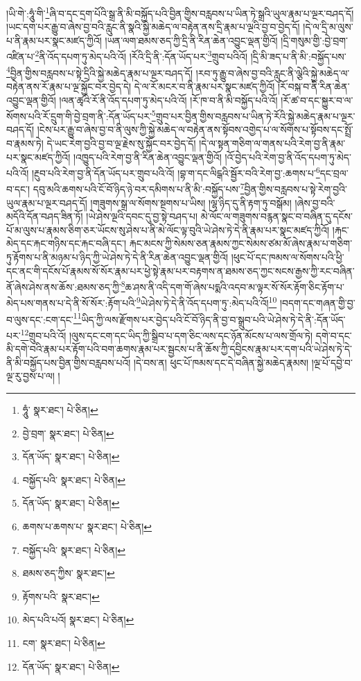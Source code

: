 །ཡི་གེ་:ཧཱུཾ་གི་\footnote{ཧཱུཾ་  སྣར་ཐང་།  པེ་ཅིན། }ཞི་བ་དང་དྲག་པོའི་སྒྲ་ནི་མི་བསྐྱོད་པའི་བྱིན་གྱིས་བརླབས་པ་ཡིན་ཏེ་སྒྲའི་ཡུལ་རྣམ་པ་ལྔར་བཤད་དོ། །ཡང་དག་པར་རྒྱུ་བ་ཞེས་བྱ་བའི་རླུང་ནི་སྣའི་སྐྱེ་མཆེད་ལ་བརྟེན་ནས་དྲི་རྣམ་པ་ལྔའི་བྱ་བ་བྱེད་དོ། །དེ་ལ་དྲི་མ་ལུས་པ་ནི་རྣམ་པར་སྣང་མཛད་ཀྱིའོ། །ཡན་ལག་ཐམས་ཅད་ཀྱི་དྲི་ནི་རིན་ཆེན་འབྱུང་ལྡན་གྱིའོ། །དྲི་གསུམ་གྱི་:བྱེ་བྲག་འཛིན་པ་\footnote{བྱེ་བྲག་  སྣར་ཐང་།  པེ་ཅིན། }ནི་འོད་དཔག་ཏུ་མེད་པའི་འོ། །རོའི་དྲི་ནི་:དོན་ཡོད་པར་\footnote{དོན་ཡོད་  སྣར་ཐང་།  པེ་ཅིན། }གྲུབ་པའིའོ། །དྲི་མི་ཟད་པ་ནི་མི་:བསྐྱོད་པས་\footnote{བསྐྱོད་པའི་  སྣར་ཐང་།  པེ་ཅིན། }བྱིན་གྱིས་བརླབས་པ་སྟེ་དྲིའི་སྐྱེ་མཆེད་རྣམ་པ་ལྔར་བཤད་དོ། །རབ་ཏུ་རྒྱུ་བ་ཞེས་བྱ་བའི་རླུང་ནི་ལྕེའི་སྐྱེ་མཆེད་ལ་བརྟེན་ནས་རོ་རྣམ་པ་ལྔ་སྐྱོང་བར་བྱེད་དེ། དེ་ལ་རོ་མངར་བ་ནི་རྣམ་པར་སྣང་མཛད་ཀྱིའོ། །རོ་བསྐ་བ་ནི་རིན་ཆེན་འབྱུང་ལྡན་གྱིའོ། །ལན་ཚྭའི་རོ་ནི་འོད་དཔག་ཏུ་མེད་པའི་འོ། །རོ་ཁ་བ་ནི་མི་བསྐྱོད་པའི་འོ། །རོ་ཚ་བ་དང་སྐྱུར་བ་ལ་སོགས་པའི་རོ་དྲུག་གི་བྱེ་བྲག་ནི་:དོན་ཡོད་པར་\footnote{དོན་ཡོད་  སྣར་ཐང་།  པེ་ཅིན། }གྲུབ་པར་བྱིན་གྱིས་བརླབས་པ་ཡིན་ཏེ་རོའི་སྐྱེ་མཆེད་རྣམ་པ་ལྔར་བཤད་དོ། །ངེས་པར་རྒྱུ་བ་ཞེས་བྱ་བ་ནི་ལུས་ཀྱི་སྐྱེ་མཆེད་ལ་བརྟེན་ནས་སྟོབས་འགྱེད་པ་ལ་སོགས་པ་སྟོབས་དང་སྤྲོ་བ་རྣམས་ཏེ། དེ་ཡང་རེག་བྱའི་བྱ་བ་ལྔ་རྗེས་སུ་སྐྱོང་བར་བྱེད་དོ། །དེ་ལ་སྟན་གཅིག་ལ་གནས་པའི་རེག་བྱ་ནི་རྣམ་པར་སྣང་མཛད་ཀྱིའོ། །འཁྱུད་པའི་རེག་བྱ་ནི་རིན་ཆེན་འབྱུང་ལྡན་གྱིའོ། །འོ་བྱེད་པའི་རེག་བྱ་ནི་འོད་དཔག་ཏུ་མེད་པའི་འོ། །རྔུབ་པའི་རེག་བྱ་ནི་དོན་ཡོད་པར་གྲུབ་པའི་འོ། །བྷ་ག་དང་ལིངྒའི་སྦྱོར་བའི་རེག་བྱ་:ཆགས་པ་\footnote{ཆགས་པ་ཆགས་པ་  སྣར་ཐང་།  པེ་ཅིན། }དང་བྲལ་བ་དང་། དབུ་མའི་ཆགས་པའི་ངོ་བོ་ཉིད་ཉེ་བར་དམིགས་པ་ནི་མི་:བསྐྱོད་པས་\footnote{བསྐྱོད་པའི་  སྣར་ཐང་།  པེ་ཅིན། }བྱིན་གྱིས་བརླབས་པ་སྟེ་རེག་བྱའི་ཡུལ་རྣམ་པ་ལྔར་བཤད་དོ། །གཟུགས་སྒྲ་ལ་སོགས་སྔགས་པ་ཡིས། །ལྷ་ཉིད་དུ་ནི་རྟག་ཏུ་བསྒོམ། །ཞེས་བྱ་བའི་མདོའི་དོན་བཤད་ཟིན་ཏོ། །ཡེ་ཤེས་ལྔའི་དབང་དུ་བྱ་སྟེ་བཤད་པ། མེ་ལོང་ལ་གཟུགས་བརྙན་སྣང་བ་བཞིན་དུ་དངོས་པོ་མ་ལུས་པ་རྣམས་ཅིག་ཅར་ཡོངས་སུ་ཤེས་པ་ནི་མེ་ལོང་ལྟ་བུའི་ཡེ་ཤེས་ཏེ་དེ་ནི་རྣམ་པར་སྣང་མཛད་ཀྱིའོ། །རྐང་མེད་དང་རྐང་གཉིས་དང་རྐང་བཞི་དང་། རྐང་མངས་ཀྱི་སེམས་ཅན་རྣམས་ཀྱང་སེམས་ཙམ་མོ་ཞེས་རྣམ་པ་གཅིག་ཏུ་རྟོགས་པ་ནི་མཉམ་པ་ཉིད་ཀྱི་ཡེ་ཤེས་ཏེ་དེ་ནི་རིན་ཆེན་འབྱུང་ལྡན་གྱིའོ། །ཕུང་པོ་དང་ཁམས་ལ་སོགས་པའི་ཕྱི་དང་ནང་གི་དངོས་པོ་རྣམས་སོ་སོར་རྣམ་པར་ཕྱེ་སྟེ་རྣམ་པར་བརྟགས་ན་ཐམས་ཅད་ཀྱང་སངས་རྒྱས་ཀྱི་རང་བཞིན་ནོ་ཞེས་ཤེས་ནས་ཆོས་:ཐམས་ཅད་ཀྱི་\footnote{ཐམས་ཅད་ཀྱིས་  སྣར་ཐང་། }ཆ་ཤས་ནི་འདི་དག་གོ་ཞེས་པདྨའི་འདབ་མ་ལྟར་སོ་སོར་རྟོག་ཅིང་རྟོག་པ་མེད་པས་གནས་པ་དེ་ནི་སོ་སོར་:རྟོག་པའི་\footnote{རྟོགས་པའི་  སྣར་ཐང་། }ཡེ་ཤེས་ཏེ་དེ་ནི་འོད་དཔག་ཏུ་:མེད་པའི་འོ།\footnote{མེད་པའི་པའོ།  སྣར་ཐང་།  པེ་ཅིན། } །བདག་དང་གཞན་གྱི་བྱ་བ་ལུས་དང་:ངག་དང་\footnote{ངག་  སྣར་ཐང་།  པེ་ཅིན། }ཡིད་ཀྱི་ལས་རྫོགས་པར་བྱེད་པའི་ངོ་བོ་ཉིད་ནི་བྱ་བ་སྒྲུབ་པའི་ཡེ་ཤེས་ཏེ་དེ་ནི་:དོན་ཡོད་པར་\footnote{དོན་ཡོད་  སྣར་ཐང་།  པེ་ཅིན། }གྲུབ་པའི་འོ། །ལུས་དང་ངག་དང་ཡིད་ཀྱི་སྒྲིབ་པ་དག་ཅིང་ལས་དང་ཉོན་མོངས་པ་ལས་གྲོལ་ཏེ། དགེ་བ་དང་མི་དགེ་བའི་རྣམ་པར་རྟོག་པའི་བག་ཆགས་རྣམ་པར་སྦྱངས་པ་ནི་ཆོས་ཀྱི་དབྱིངས་རྣམ་པར་དག་པའི་ཡེ་ཤེས་ཏེ་དེ་ནི་མི་བསྐྱོད་པས་བྱིན་གྱིས་བརླབས་པའོ། །དེ་བས་ན། ཕུང་པོ་ཁམས་དང་དེ་བཞིན་སྐྱེ་མཆེད་རྣམས། །ལྔ་པོ་དབྱེ་བ་ལྔ་རུ་བྱས་པ་ལ། །
